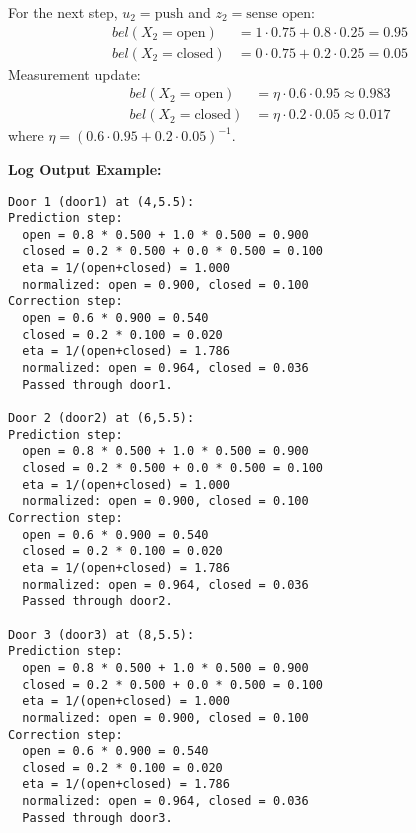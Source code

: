 \documentclass[12pt]{article}
\begin{document}
For the next step, $u_2 = \text{push}$ and $z_2 = \text{sense open}$:
\begin{align}
    bel(X_2 = \text{open}) &= 1 \cdot 0.75 + 0.8 \cdot 0.25 = 0.95 \\
    bel(X_2 = \text{closed}) &= 0 \cdot 0.75 + 0.2 \cdot 0.25 = 0.05
\end{align}
Measurement update:
\begin{align}
    bel(X_2 = \text{open}) &= \eta \cdot 0.6 \cdot 0.95 \approx 0.983 \\
    bel(X_2 = \text{closed}) &= \eta \cdot 0.2 \cdot 0.05 \approx 0.017
\end{align}
where $\eta = (0.6 \cdot 0.95 + 0.2 \cdot 0.05)^{-1}$.

\textbf{Log Output Example:}
\begin{verbatim}
Door 1 (door1) at (4,5.5):
Prediction step:
  open = 0.8 * 0.500 + 1.0 * 0.500 = 0.900
  closed = 0.2 * 0.500 + 0.0 * 0.500 = 0.100
  eta = 1/(open+closed) = 1.000
  normalized: open = 0.900, closed = 0.100
Correction step:
  open = 0.6 * 0.900 = 0.540
  closed = 0.2 * 0.100 = 0.020
  eta = 1/(open+closed) = 1.786
  normalized: open = 0.964, closed = 0.036
  Passed through door1.

Door 2 (door2) at (6,5.5):
Prediction step:
  open = 0.8 * 0.500 + 1.0 * 0.500 = 0.900
  closed = 0.2 * 0.500 + 0.0 * 0.500 = 0.100
  eta = 1/(open+closed) = 1.000
  normalized: open = 0.900, closed = 0.100
Correction step:
  open = 0.6 * 0.900 = 0.540
  closed = 0.2 * 0.100 = 0.020
  eta = 1/(open+closed) = 1.786
  normalized: open = 0.964, closed = 0.036
  Passed through door2.

Door 3 (door3) at (8,5.5):
Prediction step:
  open = 0.8 * 0.500 + 1.0 * 0.500 = 0.900
  closed = 0.2 * 0.500 + 0.0 * 0.500 = 0.100
  eta = 1/(open+closed) = 1.000
  normalized: open = 0.900, closed = 0.100
Correction step:
  open = 0.6 * 0.900 = 0.540
  closed = 0.2 * 0.100 = 0.020
  eta = 1/(open+closed) = 1.786
  normalized: open = 0.964, closed = 0.036
  Passed through door3.
\end{verbatim}
\end{document}
